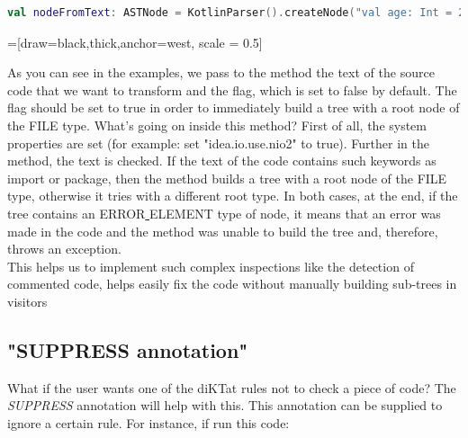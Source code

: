 \begin{lstlisting}[caption={Example of creating node.}, label={lst:example1}, language=Kotlin]
	val nodeFromText: ASTNode = KotlinParser().createNode("val age: Int = 21")
\end{lstlisting}

=[draw=black,thick,anchor=west, scale = 0.5]
  

As you can see in the examples, we pass to the method the text of the source code that we want to transform and the flag, which is set to false by default. The flag should be set to true in order to immediately build a tree with a root node of the FILE type. What's going on inside this method? First of all, the system properties are set (for example: set "idea.io.use.nio2" to true). Further in the method, the text is checked. If the text of the code contains such keywords as import or package, then the method builds a tree with a root node of the FILE type, otherwise it tries with a different root type. In both cases, at the end, if the tree contains an ERROR\underline{ }ELEMENT type of node, it means that an error was made in the code and the method was unable to build the tree and, therefore, throws an exception.\\
This helps us to implement such complex inspections like the detection of commented code, helps easily fix the code without manually building sub-trees in visitors\\

\subsection{"SUPPRESS annotation"}
\par
What if the user wants one of the diKTat rules not to check a piece of code? The \textsl{SUPPRESS} annotation will help with this. This annotation can be supplied to ignore a certain rule. For instance, if run this code:

